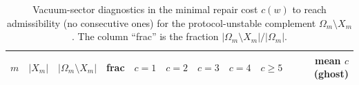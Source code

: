\begin{table}[H]
\centering
\scriptsize
\setlength{\tabcolsep}{6pt}
\renewcommand{\arraystretch}{1.15}
\begin{tabular}{rrrrrrrrrr}
\toprule
$m$ & $|X_m|$ & $|\Omega_m\setminus X_m|$ & frac &
$c=1$ & $c=2$ & $c=3$ & $c=4$ & $c\ge 5$ & mean $c$ (ghost) \\
\midrule
%
\end{tabular}
\caption{Vacuum-sector diagnostics in the minimal repair cost $c(w)$ to reach admissibility (no consecutive ones) for the protocol-unstable complement $\Omega_m\setminus X_m$. The column ``frac'' is the fraction $|\Omega_m\setminus X_m|/|\Omega_m|$.}
\label{tab:ghost_sector_repair_cost}
\end{table}


